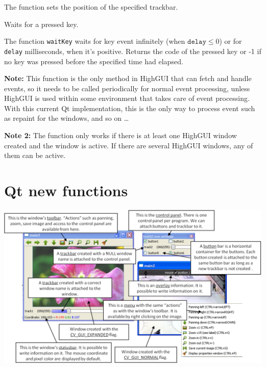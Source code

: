 The function sets the position of the specified trackbar.


Waits for a pressed key.

\begin{description}
\end{description}

The function \texttt{waitKey} waits for key event infinitely (when $\texttt{delay}\leq 0$) or for \texttt{delay} milliseconds, when it's positive. Returns the code of the pressed key or -1 if no key was pressed before the specified time had elapsed.

\textbf{Note:} This function is the only method in HighGUI that can fetch and handle events, so it needs to be called periodically for normal event processing, unless HighGUI is used within some environment that takes care of event processing. With this current Qt implementation, this is the only way to process event such as repaint for the windows, and so on \ldots

\textbf{Note 2:} The function only works if there is at least one HighGUI window created and the window is active. If there are several HighGUI windows, any of them can be active.

\fi










\section{Qt new functions}

\includegraphics[width=1.1\textwidth]{pics/Qt_GUI.png}

